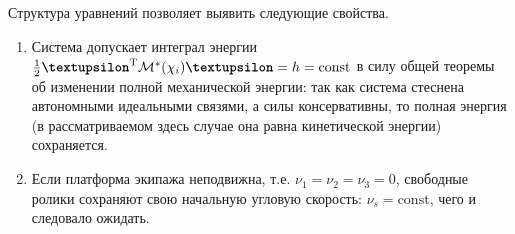 Структура уравнений позволяет выявить следующие свойства.
\begin{enumerate}[wide]
    \item Система допускает интеграл энергии $\frac{1}{2}\vnu^\mathrm{T}\M^*(\chi_i)\vnu = h = \mathrm{const}$ в силу общей теоремы об изменении полной механической энергии: так как система стеснена автономными идеальными связями, а силы консервативны, то полная энергия (в рассматриваемом здесь случае она равна кинетической энергии) сохраняется.
    
    \item Если платформа экипажа неподвижна, т.е. $\nu_1 = \nu_2 = \nu_3 = 0$, свободные ролики сохраняют свою начальную угловую скорость: $\nu_s = \mathrm{const}$, чего и следовало ожидать.
   

\end{enumerate}
